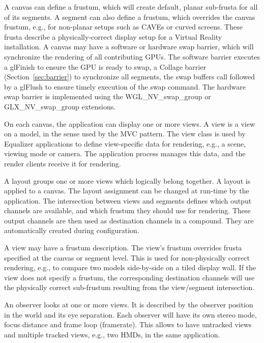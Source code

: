 \documentclass[10pt,journal,compsoc]{IEEEtran}
\newcommand{\sref}[1]{Section~\ref{#1}}
\begin{document}
A canvas can define a frustum, which will create default, planar sub-frusta for
all of its segments. A segment can also define a frustum, which overrides the
canvas frustum, e.g., for non-planar setups such as CAVEs or curved
screens. These frusta describe a physically-correct display setup for a Virtual
Reality installation. \label{sec:swap} A canvas may have a software or hardware
swap barrier, which will synchronize the rendering of all contributing GPUs. The
software barrier executes a \textsf{glFinish} to ensure the GPU is ready to
swap, a Collage barrier (\sref{sec:barrier}) to synchronize all segments, the
swap buffers call followed by a \textsf{glFlush} to ensure timely execution of
the swap command. The hardware swap barrier is implemented using the
\textsf{WGL\_NV\_swap\_group} or \textsf{GLX\_NV\_swap\_group} extensions.

On each canvas, the application can display one or more views. A view is a view
on a model, in the sense used by the MVC pattern. The view class is used by
Equalizer applications to define view-specific data for rendering, e.g., a
scene, viewing mode or camera. The application process manages this data, and
the render clients receive it for rendering.

A layout groups one or more views which logically belong together. A layout is
applied to a canvas. The layout assignment can be changed at run-time by the
application. The intersection between views and segments defines which output
channels are available, and which frustum they should use for rendering. These
output channels are then used as destination channels in a compound. They are
automatically created during configuration.

A view may have a frustum description. The view's frustum overrides frusta
specified at the canvas or segment level. This is used for non-physically
correct rendering, e.g., to compare two models side-by-side on a tiled display
wall. If the view does not specify a frustum, the corresponding destination
channels will use the physically correct sub-frustum resulting from the
view/segment intersection.

\label{sec:observer}
An observer looks at one or more views. It is described by the observer position
in the world and its eye separation. Each observer will have its own stereo
mode, focus distance and frame loop (framerate). This allows to have untracked
views and multiple tracked views, e.g., two HMDs, in the same application.

\end{document}
